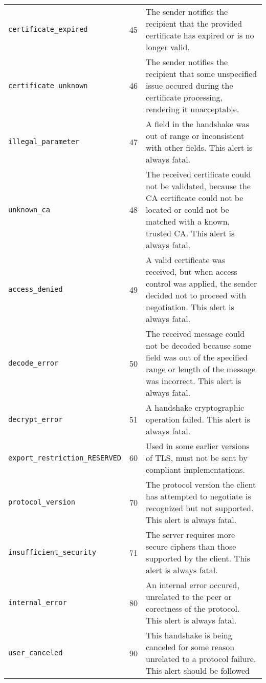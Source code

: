 \begin{tabularx}{\linewidth}{@{}l l X}
    \texttt{certificate\_expired}         & 45  & The sender notifies the recipient that the provided certificate has expired or is no longer valid. \\
    \texttt{certificate\_unknown}         & 46  & The sender notifies the recipient that some unspecified issue occured during the certificate processing,
                                                  rendering it unacceptable. \\
    \texttt{illegal\_parameter}           & 47  & A field in the handshake was out of range or inconsistent with other fields. This alert is always fatal. \\
    \texttt{unknown\_ca}                  & 48  & The received certificate could not be validated, because the CA certificate could not be located or could
                                                  not be matched with a known, trusted CA. This alert is always fatal. \\
    \texttt{access\_denied}               & 49  & A valid certificate was received, but when access control was applied, the sender decided not to proceed
                                                  with negotiation. This alert is always fatal. \\
    \texttt{decode\_error}                & 50  & The received message could not be decoded because some field was out of the specified range or length of
                                                  the message was incorrect. This alert is always fatal. \\
    \texttt{decrypt\_error}               & 51  & A handshake cryptographic operation failed. This alert is always fatal. \\
    \texttt{export\_restriction\_RESERVED}& 60  & Used in some earlier versions of TLS, must not be sent by compliant implementations. \\
    \texttt{protocol\_version}            & 70  & The protocol version the client has attempted to negotiate is recognized but not supported.
                                                  This alert is always fatal. \\
    \texttt{insufficient\_security}       & 71  & The server requires more secure ciphers than those supported by the client. This alert is always fatal. \\
    \texttt{internal\_error}              & 80  & An internal error occured, unrelated to the peer or corectness of the protocol. This alert is always fatal. \\
    \texttt{user\_canceled}               & 90  & This handshake is being canceled for some reason unrelated to a protocol failure. This alert should be followed

\end{tabularx}
